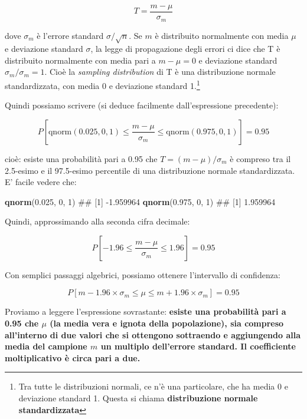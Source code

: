 \documentclass[a4paper,12pt,oneside]{book}
\newenvironment{Shaded}{\begin{snugshade}}{\end{snugshade}}
\newcommand{\KeywordTok}[1]{\textcolor[rgb]{0.13,0.29,0.53}{\textbf{#1}}}
\newcommand{\DecValTok}[1]{\textcolor[rgb]{0.00,0.00,0.81}{#1}}
\newcommand{\FloatTok}[1]{\textcolor[rgb]{0.00,0.00,0.81}{#1}}
\newcommand{\NormalTok}[1]{#1}
\theoremstyle{definition}
\theoremstyle{definition}
\theoremstyle{definition}
\theoremstyle{remark}
\begin{document}
\[T = \frac{m - \mu}{\sigma_m}\]

dove \(\sigma_m\) è l'errore standard \(\sigma / \sqrt{n}\). Se \(m\) è
distribuito normalmente con media \(\mu\) e deviazione standard
\(\sigma\), la legge di propagazione degli errori ci dice che T è
distribuito normalmente con media pari a \(m - \mu = 0\) e deviazione
standard \(\sigma_m/\sigma_m = 1\). Cioè la \emph{sampling distribution}
di T è una distribuzione normale standardizzata, con media 0 e
deviazione standard 1.\footnote{Tra tutte le distribuzioni normali, ce
  n'è una particolare, che ha media 0 e deviazione standard 1. Questa si
  chiama \textbf{distribuzione normale standardizzata}}

Quindi possiamo scrivere (si deduce facilmente dall'espressione
precedente):

\[ P \left[ \textrm{qnorm}(0.025, 0, 1) \le \frac{m - \mu }{\sigma_m} \le \textrm{qnorm}(0.975, 0, 1) \right] = 0.95 \]

cioè: esiste una probabilità pari a 0.95 che \(T = (m - \mu)/\sigma_m\)
è compreso tra il 2.5-esimo e il 97.5-esimo percentile di una
distribuzione normale standardizzata. E' facile vedere che:

\begin{Shaded}
\begin{Highlighting}[]
\KeywordTok{qnorm}\NormalTok{(}\FloatTok{0.025}\NormalTok{, }\DecValTok{0}\NormalTok{, }\DecValTok{1}\NormalTok{)}
\NormalTok{## [1] -1.959964}
\KeywordTok{qnorm}\NormalTok{(}\FloatTok{0.975}\NormalTok{, }\DecValTok{0}\NormalTok{, }\DecValTok{1}\NormalTok{)}
\NormalTok{## [1] 1.959964}
\end{Highlighting}
\end{Shaded}

Quindi, approssimando alla seconda cifra decimale:

\[P \left[ -1.96 \le \frac{m - \mu }{\sigma_m} \le 1.96 \right] = 0.95\]

Con semplici passaggi algebrici, possiamo ottenere l'intervallo di
confidenza:

\[P \left[ m -1.96 \times \sigma_m \le \mu \le m + 1.96 \times \sigma_m \right] = 0.95\]

Proviamo a leggere l'espressione sovrastante: \textbf{esiste una
probabilità pari a 0.95 che \(\mu\) (la media vera e ignota della
popolazione), sia compreso all'interno di due valori che si ottengono
sottraendo e aggiungendo alla media del campione \(m\) un multiplo
dell'errore standard. Il coefficiente moltiplicativo è circa pari a
due.}
\end{document}
